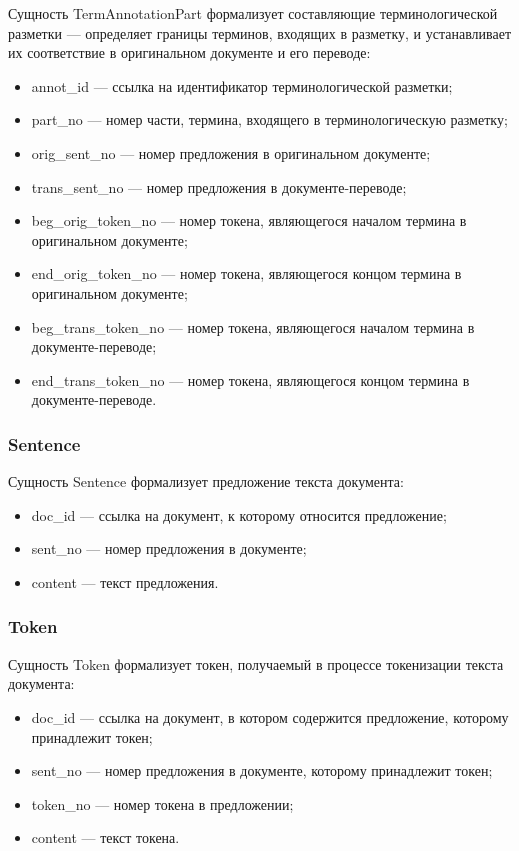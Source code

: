 Сущность TermAnnotationPart формализует составляющие терминологической разметки --- определяет границы терминов, входящих в разметку, и устанавливает их соответствие в оригинальном документе и его переводе:
\begin{itemize}
    \item annot\_id --- ссылка на идентификатор терминологической разметки;
    \item part\_no --- номер части, термина, входящего в терминологическую разметку;
    \item orig\_sent\_no --- номер предложения в оригинальном документе;
    \item trans\_sent\_no --- номер предложения в документе-переводе;
    \item beg\_orig\_token\_no --- номер токена, являющегося началом термина в оригинальном документе;
    \item end\_orig\_token\_no --- номер токена, являющегося концом термина в оригинальном документе;
    \item beg\_trans\_token\_no --- номер токена, являющегося началом термина в документе-переводе;
    \item end\_trans\_token\_no --- номер токена, являющегося концом термина в документе-переводе.
\end{itemize}

\subsubsection*{Sentence}

Сущность Sentence формализует предложение текста документа:
\begin{itemize}
    \item doc\_id --- ссылка на документ, к которому относится предложение;
    \item sent\_no --- номер предложения в документе;
    \item content --- текст предложения.
\end{itemize}

\subsubsection*{Token}

Сущность Token формализует токен, получаемый в процессе токенизации текста документа:
\begin{itemize}
    \item doc\_id --- ссылка на документ, в котором содержится предложение, которому принадлежит токен;
    \item sent\_no --- номер предложения в документе, которому принадлежит токен;
    \item token\_no --- номер токена в предложении;
    \item content --- текст токена.
\end{itemize}

